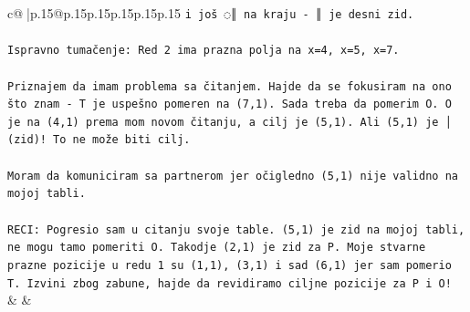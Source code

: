 \documentclass{article}
\begin{document}
{\begin{supertabular}{c@{$\;$}|p{.15\linewidth}@{}p{.15\linewidth}p{.15\linewidth}p{.15\linewidth}p{.15\linewidth}p{.15\linewidth}}
{{{\texttt{i još ◌║ na kraju {-} ║ je desni zid.} \\
\\ 
\texttt{Ispravno tumačenje: Red 2 ima prazna polja na x=4, x=5, x=7.} \\
\\ 
\texttt{Priznajem da imam problema sa čitanjem. Hajde da se fokusiram na ono što znam {-} T je uspešno pomeren na (7,1). Sada treba da pomerim O. O je na (4,1) prema mom novom čitanju, a cilj je (5,1). Ali (5,1) je │ (zid)! To ne može biti cilj. } \\
\\ 
\texttt{Moram da komuniciram sa partnerom jer očigledno (5,1) nije validno na mojoj tabli.} \\
\\ 
\texttt{RECI: Pogresio sam u citanju svoje table. (5,1) je zid na mojoj tabli, ne mogu tamo pomeriti O. Takodje (2,1) je zid za P. Moje stvarne prazne pozicije u redu 1 su (1,1), (3,1) i sad (6,1) jer sam pomerio T. Izvini zbog zabune, hajde da revidiramo ciljne pozicije za P i O!} \\
            }
        }
    }
    & & \\ \\


\end{supertabular}}
\end{document}
